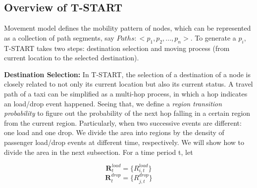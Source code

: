 \subsection{Overview of T-START}

Movement model defines the mobility pattern of nodes, which can be represented as a collection of path segments, say $Paths:<p_1,p_2,...,p_n>$.  To generate a $p_i$, T-START takes two steps: destination selection and moving process (from current location to the selected destination).

\textbf{Destination Selection:} In T-START, the selection of a destination of a node is closely related to not only its current location but also its current status.
A travel path of a taxi can be simplified as a multi-hop process, in which a hop indicates an load/drop event happened.
  Seeing that, we define a \emph{ region transition probability} to figure out the probability of the next hop falling in a certain region from the current region. Particularly, when two successive events are different: one load and one drop.
 We divide the area into regions by the density of passenger load/drop events at different time, respectively. We will show how to divide the area in the next subsection. For a time period t, let

\begin{equation}
  \textbf{R}^{load}_t = \{R_{i,t}^{load}\}
\end{equation}
\begin{equation}
   \textbf{R}^{drop}_t = \{R_{j,t}^{drop}\}
\end{equation}


